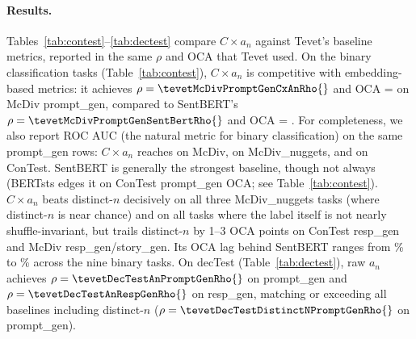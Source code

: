 
\begin{table}[t]
\centering
\caption{conTest results: Spearman $\rho$ and OCA between a set's diversity class and each metric score.
Baselines from Tevet's pre-computed metrics; $C \!\times\! a_n$ and $a_n$ are ours (Qwen2.5-3B, 50 permutations, per-byte).
Best result per task in bold.}
\label{tab:contest}
\small

\end{table}

\begin{table}[t]
\centering
\caption{decTest results: Spearman $\rho$ between temperature and each metric score (1000 samples, no\_hds).
Raw $a_n$ achieves the highest correlation on prompt\_gen and resp\_gen.}
\label{tab:dectest}
\small

\end{table}

\paragraph{Results.} Tables~\ref{tab:contest}--\ref{tab:dectest} compare $C \times a_n$ against Tevet's baseline metrics, reported in the same $\rho$ and OCA that Tevet used.
On the binary classification tasks (Table~\ref{tab:contest}), $C \times a_n$ is competitive with embedding-based metrics: it achieves $\rho = \tevetMcDivPromptGenCxAnRho{}$ and OCA = \tevetMcDivPromptGenCxAnOCA{} on McDiv prompt\_gen, compared to SentBERT's $\rho = \tevetMcDivPromptGenSentBertRho{}$ and OCA = \tevetMcDivPromptGenSentBertOCA{}.
For completeness, we also report ROC AUC (the natural metric for binary classification) on the same prompt\_gen rows: $C \times a_n$ reaches \tevetMcDivPromptGenAUC{} on McDiv, \tevetMcDivNugPromptGenCxAnAUC{} on McDiv\_nuggets, and \tevetConTestPromptGenCxAnAUC{} on ConTest.
SentBERT is generally the strongest baseline, though not always (BERTsts edges it on ConTest prompt\_gen OCA; see Table~\ref{tab:contest}). $C \times a_n$ beats distinct-$n$ decisively on all three McDiv\_nuggets tasks (where distinct-$n$ is near chance) and on all tasks where the label itself is not nearly shuffle-invariant, but trails distinct-$n$ by 1--3 OCA points on ConTest resp\_gen and McDiv resp\_gen/story\_gen.
Its OCA lag behind SentBERT ranges from \tevetCxAnVsSentBertOCAMinPct\% to \tevetCxAnVsSentBertOCAMaxPct\% across the nine binary tasks.
On decTest (Table~\ref{tab:dectest}), raw $a_n$ achieves $\rho = \tevetDecTestAnPromptGenRho{}$ on prompt\_gen and $\rho = \tevetDecTestAnRespGenRho{}$ on resp\_gen, matching or exceeding all baselines including distinct-$n$ ($\rho = \tevetDecTestDistinctNPromptGenRho{}$ on prompt\_gen).

